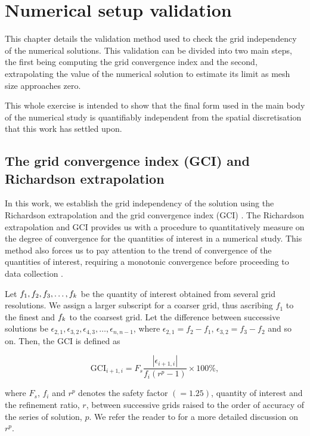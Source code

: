 \documentclass[oneside]{utmthesis}
\begin{document}
\chapter{Numerical setup validation} \label{chap:numSetup}
This chapter details the validation method used to check the grid independency of the numerical solutions. This validation can be divided into two main steps, the first being computing the grid convergence index and the second, extrapolating the value of the numerical solution to estimate its limit as mesh size approaches zero.

This whole exercise is intended to show that the final form used in the main body of the numerical study is quantifiably independent from the spatial discretisation that this work has settled upon.

\section{The grid convergence index (GCI) and Richardson extrapolation} \label{sec:richExtrap}
In this work, we establish the grid independency of the solution using the Richardson extrapolation and the grid convergence index (GCI) \citep{Richardson1927,Stern2001}. The Richardson extrapolation and GCI provides us with a procedure to quantitatively measure on the degree of convergence for the quantities of interest in a numerical study. This method also forces us to pay attention to the trend of convergence of the quantities of interest, requiring a monotonic convergence before proceeding to data collection \citep{Stern2001,MatAli2011,Maruai2018}.

Let $f_{1},f_{2},f_{3},\dots,f_{k}$ be the quantity of interest obtained from several grid resolutions. We assign a larger subscript for a coarser grid, thus ascribing $f_{1}$ to the finest and $f_{k}$ to the coarsest grid. Let the difference between successive solutions be $\epsilon_{2,1},\epsilon_{3,2},\epsilon_{4,3},\dots,\epsilon_{n,n-1}$, where $\epsilon_{2,1} = f_{2} - f_{1}$, $\epsilon_{3,2} = f_{3} - f_{2}$ and so on. Then, the GCI is defined as

\begin{equation}
  \text{GCI}_{i+1,i} = F_{s} \frac{\left |\epsilon_{i+1,i} \right |}{f_{i} \left ( r^{p} - 1 \right )} \times 100\%,
  \label{eq:gci}
\end{equation}

\noindent where $F_{s}$, $f_{i}$ and $r^{p}$ denotes the safety factor $\left ( = 1.25 \right )$, quantity of interest and the refinement ratio, $r$, between successive grids raised to the order of accuracy of the series of solution, $p$. We refer the reader to \citet{Stern2001,Langley2018} for a more detailed discussion on $r^{p}$.
\end{document}

